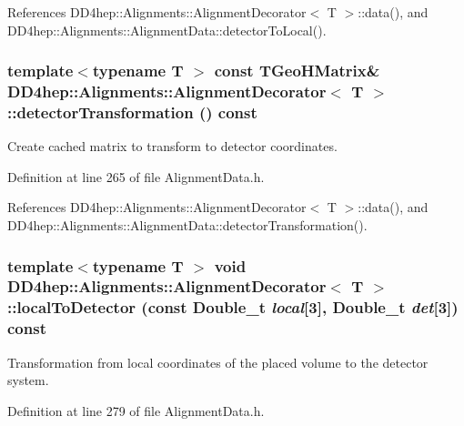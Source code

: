 References DD4hep::Alignments::AlignmentDecorator$<$ T $>$::data(), and DD4hep::Alignments::AlignmentData::detectorToLocal().\hypertarget{class_d_d4hep_1_1_alignments_1_1_alignment_decorator_a729b16755c310d2a16a46bc5f9257341}{
\subsubsection[{detectorTransformation}]{\setlength{\rightskip}{0pt plus 5cm}template$<$typename T $>$ const TGeoHMatrix\& {\bf DD4hep::Alignments::AlignmentDecorator}$<$ {\bf T} $>$::detectorTransformation () const}}
\label{class_d_d4hep_1_1_alignments_1_1_alignment_decorator_a729b16755c310d2a16a46bc5f9257341}


Create cached matrix to transform to detector coordinates. 

Definition at line 265 of file AlignmentData.h.

References DD4hep::Alignments::AlignmentDecorator$<$ T $>$::data(), and DD4hep::Alignments::AlignmentData::detectorTransformation().\hypertarget{class_d_d4hep_1_1_alignments_1_1_alignment_decorator_a70b8675b30dc74918eae23bd1d161d24}{
\subsubsection[{localToDetector}]{\setlength{\rightskip}{0pt plus 5cm}template$<$typename T $>$ void {\bf DD4hep::Alignments::AlignmentDecorator}$<$ {\bf T} $>$::localToDetector (const Double\_\-t {\em local}\mbox{[}3\mbox{]}, \/  Double\_\-t {\em det}\mbox{[}3\mbox{]}) const}}
\label{class_d_d4hep_1_1_alignments_1_1_alignment_decorator_a70b8675b30dc74918eae23bd1d161d24}


Transformation from local coordinates of the placed volume to the detector system. 

Definition at line 279 of file AlignmentData.h.

